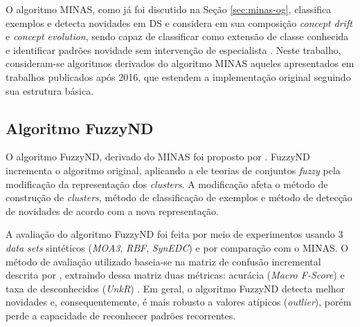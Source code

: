 
\newcommand{\cluster}{\emph{cluster}\xspace}
\newcommand{\clusters}{\emph{clusters}\xspace}

\newcommand{\dataset}{\emph{data set}\xspace}
\newcommand{\datasets}{\emph{data sets}\xspace}

O algoritmo MINAS, como já foi discutido na Seção \ref{sec:minas-og}, classifica
exemplos e detecta
novidades em DS e considera em sua composição \emph{concept drift} e
\emph{concept evolution}, sendo capaz de classificar como extensão de classe
conhecida e identificar padrões novidade sem intervenção de especialista
\cite{Faria2015minas}.
Neste trabalho, consideram-se algoritmos derivados do algoritmo MINAS
aqueles apresentados em trabalhos publicados após 2016, que estendem a
implementação original seguindo sua estrutura básica.

\subsection{Algoritmo FuzzyND}


O algoritmo FuzzyND, derivado do MINAS foi proposto por .
FuzzyND incrementa o algoritmo original, aplicando a ele teorias de
conjuntos \emph{fuzzy} pela modificação da representação dos \clusters.
A modificação afeta o método de construção de \clusters, método de classificação
de exemplos e método de detecção de novidades de acordo com a nova representação.


A avaliação do algoritmo FuzzyND foi feita por meio de experimentos usando 3 
\datasets sintéticos (\emph{MOA3}, \emph{RBF}, \emph{SynEDC})
e por comparação com o MINAS.
O método de avaliação utilizado baseia-se na matriz de confusão incremental
descrita por , extraindo dessa matriz duas métricas:
acurácia (\emph{Macro F-Score}) \cite{Sokolova2009} e
taxa de desconhecidos (\emph{UnkR}) \cite{Faria2015minas}.
Em geral, o algoritmo FuzzyND detecta melhor novidades e, consequentemente,
é mais robusto a valores atípicos (\emph{outlier}), porém perde a capacidade
de reconhecer padrões recorrentes.


